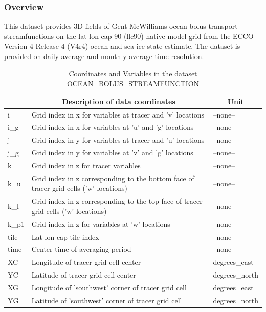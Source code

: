 \subsubsection{Overview}
This dataset provides 3D fields of Gent-McWilliams ocean bolus transport streamfunctions on the lat-lon-cap 90 (llc90) native model grid from the ECCO Version 4 Release 4 (V4r4) ocean and sea-ice state estimate. The dataset is provided on daily-average and monthly-average time resolution. 
\begin{longtable}{|m{}|m{}|m{}|}
\caption{Coordinates and Variables in the dataset OCEAN\_BOLUS\_STREAMFUNCTION}
\label{tab:table-OCEAN_BOLUS_STREAMFUNCTION-fields} \\ 
\hline \endhead \hline \endfoot
\rowcolor{lightgray} \multicolumn{1}{|c|}{\textbf{Coordinates}} & \multicolumn{1}{|c|}{\textbf{Description of data coordinates}} &  \multicolumn{1}{|c|}{\textbf{Unit}}\\ \hline
i &Grid index in x for variables at tracer and 'v' locations &--none--  \\ \hline
i\_g &Grid index in x for variables at 'u' and 'g' locations &--none--  \\ \hline
j &Grid index in y for variables at tracer and 'u' locations &--none--  \\ \hline
j\_g &Grid index in y for variables at 'v' and 'g' locations &--none--  \\ \hline
k &Grid index in z for tracer variables &--none--  \\ \hline
k\_u &Grid index in z corresponding to the bottom face of tracer grid cells ('w' locations) &--none--  \\ \hline
k\_l &Grid index in z corresponding to the top face of tracer grid cells ('w' locations) &--none--  \\ \hline
k\_p1 &Grid index in z for variables at 'w' locations &--none--  \\ \hline
tile &Lat-lon-cap tile index &--none--  \\ \hline
time &Center time of averaging period &--none--  \\ \hline
XC &Longitude of tracer grid cell center &degrees\_east  \\ \hline
YC &Latitude of tracer grid cell center &degrees\_north  \\ \hline
XG &Longitude of 'southwest' corner of tracer grid cell &degrees\_east  \\ \hline
YG &Latitude of 'southwest' corner of tracer grid cell &degrees\_north  \\ \hline

\end{longtable}
